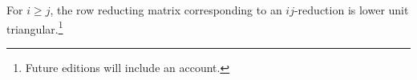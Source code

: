 
\begin{proposition}
  For $i \geq j$, the row reducting matrix corresponding to an $ij$-reduction is lower unit triangular.\footnote{Future editions will include an account.}
\end{proposition}

\blankpage

